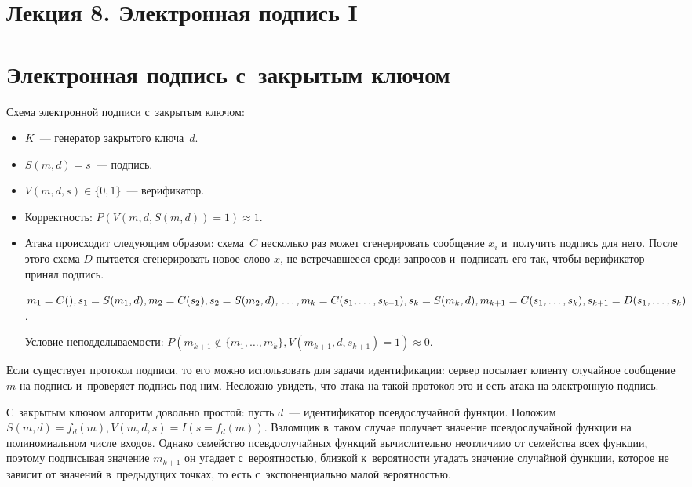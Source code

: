 \documentclass{article}
\begin{document}
\section*{Лекция 8. Электронная подпись I}
\resetcntrs

\section{Электронная подпись с~закрытым ключом}

Схема электронной подписи с~закрытым ключом:
\begin{itemize}
	\item $K$~--- генератор закрытого ключа~$d$.
	\item $S(m, d) = s$~--- подпись.
	\item $V(m, d, s) \in \{0, 1\}$~--- верификатор.
	\item Корректность: $P(V(m, d, S(m, d)) = 1) \approx 1$.
	\item Атака происходит следующим образом: схема~$C$ несколько раз может
		сгенерировать сообщение $x_i$ и~получить подпись для него. После этого схема
		$D$ пытается сгенерировать новое слово $x$, не встречавшееся среди запросов
		и~подписать его так, чтобы верификатор принял подпись.

		$m_1 = C(), s_1 = S(m_1, d),\\
		 m_2 = C(s_2), s_2 = S(m_2, d),\\
		 \ldots,\\
		 m_k = C(s_1, \ldots, s_{k-1}), s_k = S(m_k, d),\\
		 m_{k+1} = C(s_1, \ldots, s_k), s_{k+1} = D(s_1, \ldots, s_k)$.

		Условие неподделываемости: $P(m_{k+1} \notin \{m_1, \ldots, m_k\},
		V(m_{k+1}, d, s_{k+1}) = 1) \approx 0$.
\end{itemize}

Если существует протокол подписи, то его можно использовать для задачи
идентификации: сервер посылает клиенту случайное сообщение~$m$ на подпись
и~проверяет подпись под ним. Несложно увидеть, что атака на такой протокол это и
есть атака на электронную подпись.

С~закрытым ключом алгоритм довольно простой: пусть $d$~--- идентификатор
псевдослучайной функции. Положим~$S(m, d) = f_d(m), V(m, d, s) = I(s = f_d(m))$.
Взломщик в~таком случае получает значение псевдослучайной функции на
полиномиальном числе входов. Однако семейство псевдослучайных функций
вычислительно неотличимо от семейства всех функции, поэтому подписывая значение
$m_{k+1}$ он угадает с~вероятностью, близкой к~вероятности угадать значение
случайной функции, которое не зависит от значений в~предыдущих точках, то есть
с~экспоненциально малой вероятностью.
\end{document}
